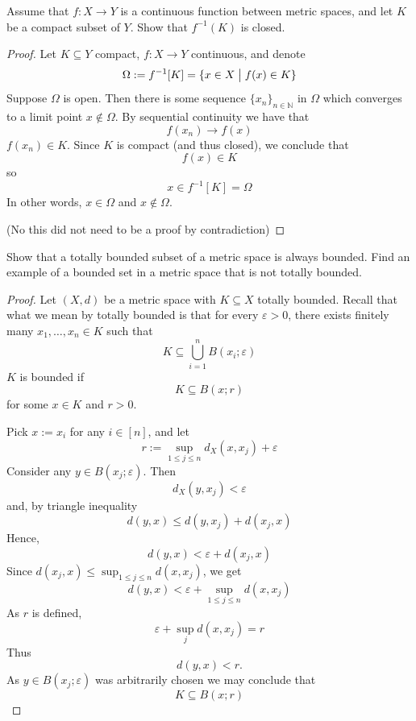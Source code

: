 \begin{prob}
    Assume that $f: X \to Y$ is a continuous function between 
    metric spaces, and let $K$ be a compact subset of $Y$. 
    Show that $f^{-1}(K)$ is closed. 
\end{prob}
\begin{proof}
    Let $K \subseteq Y$ compact, $f : X \to Y$ continuous, and denote 
    \[
        \Omega := f^{-1}[K] = \{x \in X \bigm| f(x) \in K\}
    \]
    Suppose $\Omega$ is open. Then there is some sequence 
    $\{x_n\}_{n\in\mathbb N}$ in $\Omega$ which converges 
    to a limit point $x \not\in \Omega$. 
    By sequential continuity we have that 
    \[
        f(x_n) \to f(x)
    \]
    $f(x_n) \in K$. Since $K$ is compact (and thus closed), 
    we conclude that 
    \[
        f(x) \in K
    \]
    so 
    \[
        x \in f^{-1}[K] = \Omega
    \]
    In other words, $x \in \Omega$ and $x \not\in \Omega$. 

    (No this did not need to be a proof by contradiction)
\end{proof}
\begin{prob}
    Show that a totally bounded subset of a metric space is always
    bounded. Find an example of a bounded set in a metric space 
    that is not totally bounded. 
\end{prob}
\begin{proof}
    Let $(X,d)$ be a metric space with $K \subseteq X$ totally 
    bounded. Recall that what we mean by totally bounded is 
    that for every $\varepsilon > 0$, there exists finitely 
    many $x_1, \ldots, x_n \in K$ such that 
    \[
        K \subseteq \bigcup_{i=1}^n B(x_i;\varepsilon)
    \]
    $K$ is bounded if 
    \[
        K \subseteq B(x;r)
    \]
    for some $x \in K$ and $r > 0$.

    Pick $x := x_i$ for any $i \in [n]$, and let 
    \[
        r := \sup_{1 \leq j \leq n} d_X(x,x_j) 
        + \varepsilon
    \]
    Consider any $y \in B(x_j; \varepsilon)$.  
    Then 
    \[
        d_X(y,x_j) < \varepsilon
    \]
    and, by triangle inequality 
    \[
        d(y,x) \le d(y,x_j) + d(x_j,x)
    \]
    Hence, 
    \[
        d(y,x) < \varepsilon + d(x_j,x)
    \]
    Since $d(x_j,x) \le \sup_{1 \le j \le n} d(x,x_j)$, we get 
    \[
        d(y,x)< \varepsilon + \sup_{1 \le j \le n} d(x,x_j)
    \]
    As $r$ is defined, 
    \[
        \varepsilon + \sup_{j} d(x,x_j) = r
    \]
    Thus 
    \[
        d(y,x) < r.
    \]
    As $y \in B(x_j;\varepsilon)$ was arbitrarily chosen 
    we may conclude that 
    \[
        K \subseteq B(x;r)
    \]
\end{proof}


